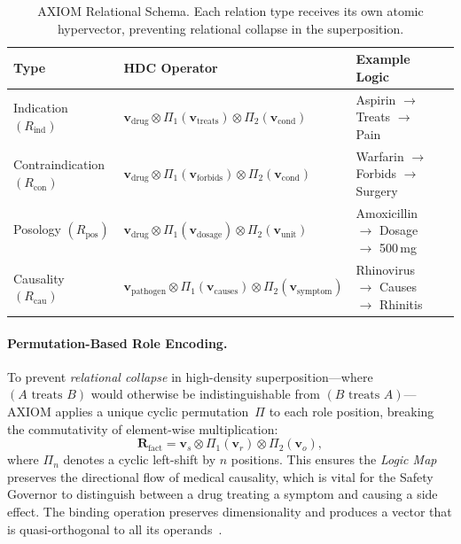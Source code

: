 \documentclass[11pt,a4paper]{article}
\begin{document}
\begin{table}[h]
    \centering
    \caption{AXIOM Relational Schema.  Each relation type receives its own
    atomic hypervector, preventing relational collapse in the superposition.}
    \label{tab:relations}
    \begin{tabular}{@{}llll@{}}
        \toprule
        \textbf{Type} & \textbf{HDC Operator}
        & \textbf{Example Logic} \\
        \midrule
        Indication $(R_{\text{ind}})$
            & $\mathbf{v}_{\text{drug}} \otimes
               \Pi_1(\mathbf{v}_{\text{treats}}) \otimes
               \Pi_2(\mathbf{v}_{\text{cond}})$
            & Aspirin $\to$ Treats $\to$ Pain \\
        Contraindication $(R_{\text{con}})$
            & $\mathbf{v}_{\text{drug}} \otimes
               \Pi_1(\mathbf{v}_{\text{forbids}}) \otimes
               \Pi_2(\mathbf{v}_{\text{cond}})$
            & Warfarin $\to$ Forbids $\to$ Surgery \\
        Posology $(R_{\text{pos}})$
            & $\mathbf{v}_{\text{drug}} \otimes
               \Pi_1(\mathbf{v}_{\text{dosage}}) \otimes
               \Pi_2(\mathbf{v}_{\text{unit}})$
            & Amoxicillin $\to$ Dosage $\to$ 500\,mg \\
        Causality $(R_{\text{cau}})$
            & $\mathbf{v}_{\text{pathogen}} \otimes
               \Pi_1(\mathbf{v}_{\text{causes}}) \otimes
               \Pi_2(\mathbf{v}_{\text{symptom}})$
            & Rhinovirus $\to$ Causes $\to$ Rhinitis \\
        \bottomrule
    \end{tabular}
\end{table}

\paragraph{Permutation-Based Role Encoding.}
To prevent \emph{relational collapse} in high-density superposition---where
$(A \text{ treats } B)$ would otherwise be indistinguishable from
$(B \text{ treats } A)$---AXIOM applies a unique cyclic permutation~$\Pi$
to each role position, breaking the commutativity of element-wise
multiplication:
\begin{equation}
    \mathbf{R}_{\text{fact}} = \mathbf{v}_{s}
    \otimes \Pi_1(\mathbf{v}_{r})
    \otimes \Pi_2(\mathbf{v}_{o}),
    \label{eq:binding}
\end{equation}
where $\Pi_n$ denotes a cyclic left-shift by $n$ positions.  This ensures
the \emph{Logic Map} preserves the directional flow of medical causality,
which is vital for the Safety Governor to distinguish between a drug
treating a symptom and causing a side effect.  The binding operation
preserves dimensionality and produces a vector that is quasi-orthogonal
to all its operands~\citep{plate1995holographic}.
\end{document}
